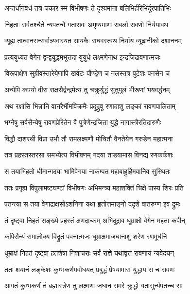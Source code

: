 \twolineshloka
{अन्तर्धानवधं तत्र चकार स्म विभीषणः}
{ते दृश्यमाना बलिभिर्हरिभिर्दूरपातिभिः}%

\twolineshloka
{निहताः सर्वतश्चैते न्यपतन्वै गतासवः}
{अमृष्यमाणः सबलो रावणो निर्ययावथ}%

\twolineshloka
{व्यूह्य तान्वानरान्सर्वान्न्यवारयत सायकैः}
{राघवस्त्वथ निर्याय व्यूढानीको दशाननम्}%

\twolineshloka
{प्रत्ययुध्यत वेगेन द्वन्द्वयुद्धमभूत्तदा}
{युयुधे लक्ष्मणेनाथ इन्द्रजिद्रावणात्मजः}%

\twolineshloka
{विरूपाक्षेण सुग्रीवस्तारेयेणापि खर्वटः}
{पौण्ड्रेण च नलस्तत्र पुटेशः पनसेन च}%

\twolineshloka
{अन्येपि कपयो वीरा राक्षसैर्द्वन्द्वमेत्य तु}
{चक्रुर्युद्धं सुतुमुलं भीरूणां भयवर्द्धनम्}%

\twolineshloka
{अथ रक्षांसि भिन्नानि वानरैर्भीमविक्रमैः}
{प्रदुद्रुवू रणादाशु लङ्कां रावणपालिताम्}%

\twolineshloka
{भग्नेषु सर्वसैन्येषु रावणप्रेरितेन वै}
{पुत्रेणेन्द्रजिता युद्धे नागास्त्रैरतिदारुणैः}%

\twolineshloka
{विद्धौ दाशरथी विप्रा उभौ तौ रामलक्ष्मणौ}
{मोचितौ वैनतेयेन गरुडेन महात्मना}%

\twolineshloka
{तत्र प्रहस्तस्तरसा समभ्येत्य विभीषणम्}
{गदया ताडयामास विनद्य रणकर्कशः}%

\twolineshloka
{स तयाभिहतो धीमान्गदया भामिवेगया}
{नाकम्पत महाबाहुर्हिमवानिव सुस्थितः}%

\twolineshloka
{ततः प्रगृह्य विपुलामष्टघण्टां विभीषणः}
{अभिमन्त्र्य महाशक्तिं चिक्षे पास्य शिरः प्रति}%

\twolineshloka
{पतन्त्या स तया वेगाद्राक्षसोऽशनिना यथा}
{हृतोत्तमाङ्गो ददृशे वातरुग्ण इव द्रुमः}%

\twolineshloka
{तं दृष्ट्वा निहतं सङ्ख्ये प्रहस्तं क्षणदाचरम्}
{अभिदुद्राव धूम्राक्षो वेगेन महता कपीन्}%

\twolineshloka
{कपिसैन्यं समालोक्य विद्रुतं पवनात्मजः}
{धूम्राक्षमाजघानाशु शरेण रणमूर्धनि}%

\twolineshloka
{धूम्राक्षं निहतं दृष्ट्वा हतशेषा निशाचराः}
{सर्वं राज्ञे यथावृत्तं रावणाय न्यवेदयन्}%

\twolineshloka
{ततः शयानं लङ्केशः कुम्भकर्णमबोधयत्}
{प्रबुद्धं प्रेषयामास युद्धाय स च रावणः}%

\twolineshloka
{आगतं कुम्भकर्णं तं ब्रह्मास्त्रेण तु लक्ष्मणः}
{जघान समरे क्रुद्धो गतासुर्न्यपतच्च सः}%

